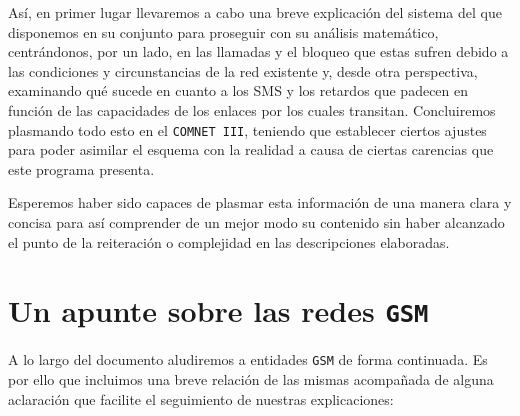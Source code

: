\documentclass[10pt]{article}
\begin{document}
		Así, en primer lugar llevaremos a cabo una breve explicación del sistema del que disponemos en su conjunto para proseguir con su análisis matemático, centrándonos, por un lado, en las llamadas y el bloqueo que estas sufren debido a las condiciones y circunstancias de la red existente y, desde otra perspectiva, examinando qué sucede en cuanto a los SMS y los retardos que padecen en función de las capacidades de los enlaces por los cuales transitan. Concluiremos plasmando todo esto en el \texttt{COMNET III}, teniendo que establecer ciertos ajustes para poder asimilar el esquema con la realidad a causa de ciertas carencias que este programa presenta.

		Esperemos haber sido capaces de plasmar esta información de una manera clara y concisa para así comprender de un mejor modo su contenido sin haber alcanzado el punto de la reiteración o complejidad en las descripciones elaboradas.

	\section{Un apunte sobre las redes \texttt{GSM}}
		A lo largo del documento aludiremos a entidades \texttt{GSM} de forma continuada. Es por ello que incluimos una breve relación de las mismas acompañada de alguna aclaración que facilite el seguimiento de nuestras explicaciones:
\end{document}
